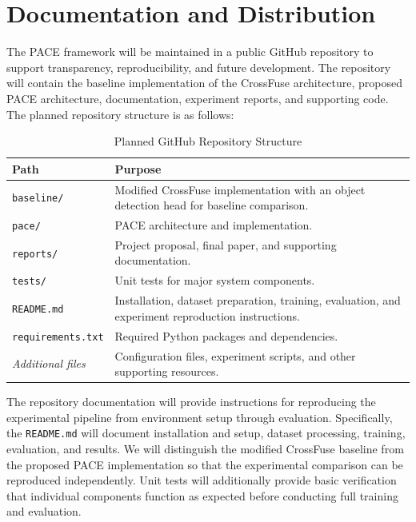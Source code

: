 \documentclass[conference]{IEEEtran}
\begin{document}

\section{Documentation and Distribution}

The PACE framework will be maintained in a public GitHub repository to support transparency, reproducibility, and future development. The repository will contain the baseline implementation of the CrossFuse architecture, proposed PACE architecture, documentation, experiment reports, and supporting code. The planned repository structure is as follows:

\begin{table}[H]
\centering
\caption{Planned GitHub Repository Structure}
\label{tab:repository}
\renewcommand{\arraystretch}{1.15}
\begin{tabular}{p{}p{}}
\toprule
\textbf{Path} & \textbf{Purpose} \\
\midrule
\texttt{baseline/} & Modified CrossFuse implementation with an object detection head for baseline comparison. \\

\texttt{pace/} & PACE architecture and implementation. \\

\texttt{reports/} & Project proposal, final paper, and supporting documentation. \\

\texttt{tests/} & Unit tests for major system components. \\

\texttt{README.md} & Installation, dataset preparation, training, evaluation, and experiment reproduction instructions. \\

\texttt{requirements.txt} & Required Python packages and dependencies. \\

\textit{Additional files} & Configuration files, experiment scripts, and other supporting resources. \\
\bottomrule
\end{tabular}
\end{table}

The repository documentation will provide instructions for reproducing the experimental pipeline from environment setup through evaluation. Specifically, the \texttt{README.md} will document installation and setup, dataset processing, training, evaluation, and results. We will distinguish the modified CrossFuse baseline from the proposed PACE implementation so that the experimental comparison can be reproduced independently. Unit tests will additionally provide basic verification that individual components function as expected before conducting full training and evaluation.
\end{document}
